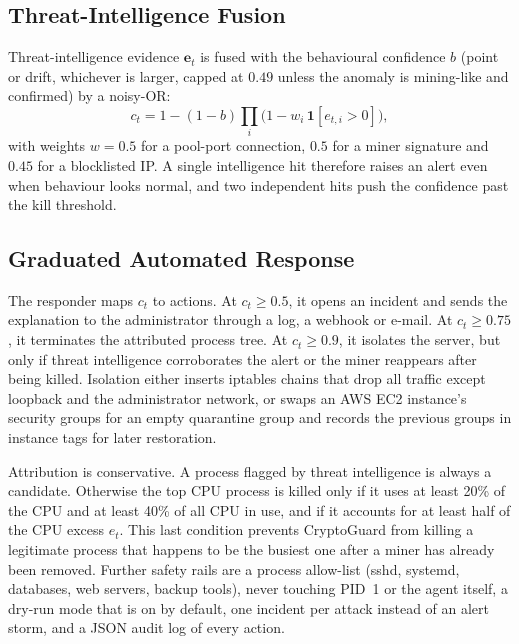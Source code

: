\documentclass[conference]{IEEEtran}
\begin{document}
\subsection{Threat-Intelligence Fusion}
\label{sec:fusion}
Threat-intelligence evidence $\mathbf{e}_t$ is fused with the behavioural confidence $b$ (point or drift, whichever is larger, capped at $0.49$ unless the anomaly is mining-like and confirmed) by a noisy-OR:
\begin{equation}
  c_t = 1 - (1-b)\prod_i \big(1 - w_i\,\mathbf{1}[e_{t,i}>0]\big),
\end{equation}
with weights $w=0.5$ for a pool-port connection, $0.5$ for a miner signature and $0.45$ for a blocklisted IP. A single intelligence hit therefore raises an alert even when behaviour looks normal, and two independent hits push the confidence past the kill threshold.

\subsection{Graduated Automated Response}
The responder maps $c_t$ to actions. At $c_t\ge0.5$, it opens an incident and sends the explanation to the administrator through a log, a webhook or e-mail. At $c_t\ge0.75$, it terminates the attributed process tree. At $c_t\ge0.9$, it isolates the server, but only if threat intelligence corroborates the alert or the miner reappears after being killed. Isolation either inserts iptables chains that drop all traffic except loopback and the administrator network, or swaps an AWS EC2 instance's security groups for an empty quarantine group and records the previous groups in instance tags for later restoration.

Attribution is conservative. A process flagged by threat intelligence is always a candidate. Otherwise the top CPU process is killed only if it uses at least 20\% of the CPU and at least 40\% of all CPU in use, and if it accounts for at least half of the CPU excess $e_t$. This last condition prevents CryptoGuard from killing a legitimate process that happens to be the busiest one after a miner has already been removed. Further safety rails are a process allow-list (sshd, systemd, databases, web servers, backup tools), never touching PID~1 or the agent itself, a dry-run mode that is on by default, one incident per attack instead of an alert storm, and a JSON audit log of every action.

\end{document}
